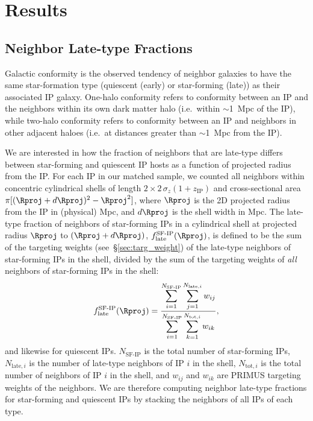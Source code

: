 
\section{Results}\label{sec:results}

\subsection{Neighbor Late-type Fractions}\label{sec:LTfraction}

Galactic conformity is the observed tendency of neighbor galaxies to have the same star-formation type (quiescent (early) or star-forming (late)) as their associated IP galaxy.
One-halo conformity refers to conformity between an IP and the neighbors within its own dark matter halo (i.e.~within $\sim$1~Mpc of the IP),
while two-halo conformity refers to conformity between an IP and neighbors in other adjacent haloes (i.e.~at distances greater than $\sim$1~Mpc from the IP).

We are interested in how the fraction of neighbors that are late-type differs between star-forming and quiescent IP hosts as a function of projected radius from the IP.
For each IP in our matched sample, we counted all neighbors within concentric cylindrical shells of length {$2\times2\,\sigma_{z}(1+z_{\text{IP}})$} and cross-sectional area
${\pi[(\Rproj+d\Rproj)^2-\Rproj^2]}$, where $\Rproj$ is the 2D projected radius from the IP in (physical) Mpc, and $d\Rproj$ is the shell width in Mpc.
The late-type fraction of neighbors of star-forming IPs in a cylindrical shell at projected radius $\Rproj$ to ${(\Rproj+d\Rproj)}$, $f^{\textrm{SF-IP}}_{\textrm{late}}
(\Rproj)$, is defined to be the sum of the targeting weights (see~\S\ref{sec:targ_weight}) of the late-type neighbors of star-forming IPs in the shell, divided by the sum of the
targeting weights of \emph{all} neighbors of star-forming IPs in the shell:
\begin{equation}
        f^{\textrm{SF-IP}}_{\textrm{late}}(\Rproj) = \frac
        {\displaystyle \sum_{i=1}^{N_{\textrm{SF-IP}}} \sum_{j=1}^{N_{\textrm{late},i}} w_{ij} }
        {\displaystyle \sum_{i=1}^{N_{\textrm{SF-IP}}} \sum_{k=1}^{N_{\textrm{tot},i}} w_{ik} }, \nonumber
\end{equation}
and likewise for quiescent IPs.
$N_{\textrm{SF-IP}}$ is the total number of star-forming IPs, $N_{\textrm{late},i}$ is the number of late-type neighbors of IP $i$ in the shell, $N_{\textrm{tot},i}$ is the
total number of neighbors of IP $i$ in the shell, and $w_{ij}$ and $w_{ik}$ are PRIMUS targeting weights of the neighbors.
We are therefore computing neighbor late-type fractions for star-forming and quiescent IPs by stacking the neighbors of all IPs of each type.

